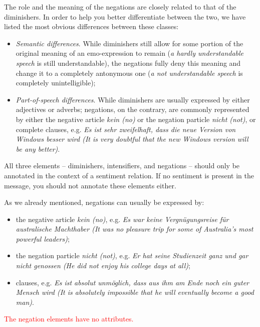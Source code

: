 \documentclass[11pt,a4paper]{article}
\begin{document}
The role and the meaning of the negations are closely related to that of the
diminishers.  In order to help you better differentiate between the two, we
have listed the most obvious differences between these classes:
\begin{itemize}
  \item\textit{Semantic differences}.  While diminishers still allow
    for some portion of the original meaning of an emo-expression to
    remain (\textit{a hardly understandable speech} is still
    understandable), the negations fully deny this meaning and change
    it to a completely antonymous one (\textit{a not understandable
      speech} is completely unintelligible);

  \item\textit{Part-of-speech differences}.  While diminishers are usually
    expressed by either adjectives or adverbs; negations, on the contrary, are
    commonly represented by either the negative article \textit{kein (no)} or
    the negation particle \textit{nicht (not)}, or complete clauses, e.g.
    \textit{Es ist sehr zweifelhaft, dass die neue Version von Windows besser
      wird (It is very doubtful that the new Windows version will be any
      better)}.

\end{itemize}
All three elements -- diminishers, intensifiers, and negations -- should only
be annotated in the context of a sentiment relation.  If no sentiment is
present in the message, you should not annotate these elements either.

As we already mentioned, negations can usually be expressed by:
\begin{itemize}
  \item the negative article \textit{kein (no)}, e.g. \textit{Es war keine
    Vergn\"ugungsreise f\"ur australische Machthaber (It was no pleasure trip
    for some of Australia's most powerful leaders)};
  \item the negation particle \textit{nicht (not)}, e.g. \textit{Er hat seine
    Studienzeit ganz und gar nicht genossen (He did not enjoy his college days
    at all)};
  \item clauses, e.g. \textit{Es ist absolut unm\"oglich, dass aus ihm am Ende
    noch ein guter Mensch wird (It is absolutely impossible that he will
    eventually become a good man)}.
\end{itemize}
\textcolor{red}{The negation elements have no attributes.}
\end{document}

